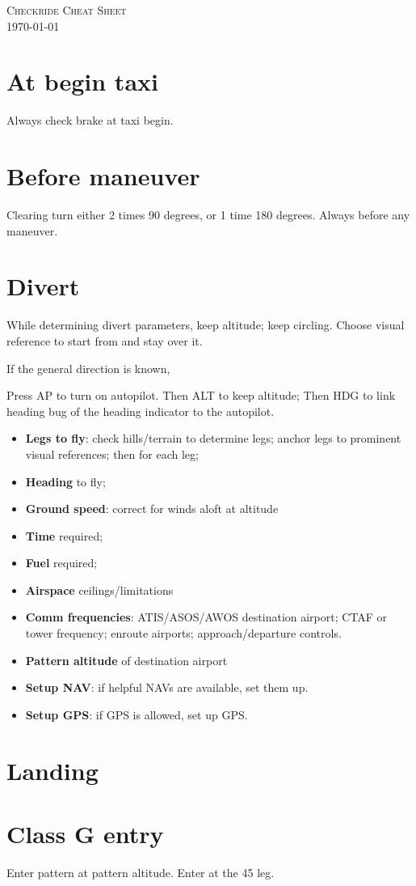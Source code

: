 \documentclass[article,9pt,landscape]{memoir}
\begin{document}



\begin{multicols*}{4}
  \textsc{Checkride Cheat Sheet\\\today\\[0.5em]}

  \chapter{At begin taxi}
  Always check brake at taxi begin.

  \chapter{Before maneuver}
  Clearing turn either 2 times 90 degrees, or 1
  time 180 degrees.  Always before any maneuver.

  \chapter{Divert}
  While determining divert parameters, keep altitude; keep circling.  Choose
  visual reference to start from and stay over it.

  If the general direction is known, 

   Press \textsc{AP} to turn on autopilot.  Then
  \textsc{ALT} to keep altitude; Then \textsc{HDG} to link heading bug
  of the heading indicator to the autopilot.

  \begin{itemize}
  \item \textbf{Legs to fly}: check hills/terrain to determine legs;
    anchor legs to prominent visual references; then for each leg;
    \item \textbf{Heading} to fly;
    \item \textbf{Ground speed}: correct for winds aloft at altitude
    \item \textbf{Time} required; 
    \item \textbf{Fuel} required;
    \item \textbf{Airspace} ceilings/limitations
    \item \textbf{Comm frequencies}: ATIS/ASOS/AWOS destination
      airport; CTAF or tower frequency; enroute airports;
      approach/departure controls.
    \item \textbf{Pattern altitude} of destination airport
    \item \textbf{Setup NAV}: if helpful NAVs are available, set them up.
    \item \textbf{Setup GPS}: if GPS is allowed, set up GPS.
  \end{itemize}

  \chapter{Landing}
  \chapter{Class G entry}
  Enter pattern at pattern altitude.  Enter at the 45 leg.

  

\end{multicols*}
\end{document}
